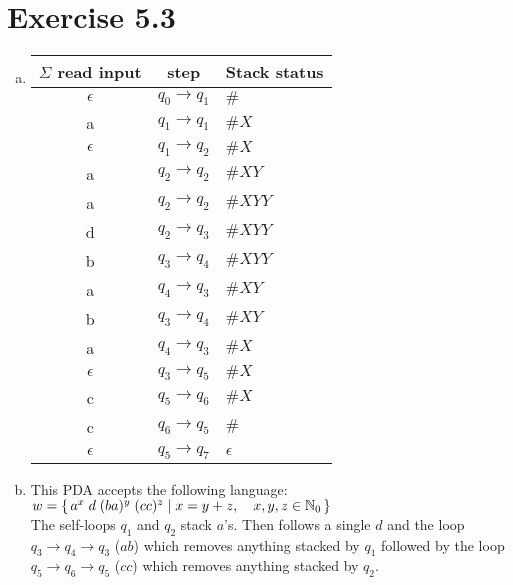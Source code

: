 \documentclass{article} %
\newcommand{\homeworkNumber}{5}
\begin{document}
\section*{Exercise \homeworkNumber.3}
\begin{enumerate}[(a)]
	\item
	\renewcommand{\arraystretch}{1.25}
	\begin{tabular}{ c | c | l }
	$\Sigma$ read input & step & Stack status\\
	\hline
	$\epsilon$ & $q_0 \to q_1$ & $\#$\\
	a & $q_1 \to q_1$ & $\#X$\\
	$\epsilon$ & $q_1 \to q_2$ & $\#X$\\
	a & $q_2 \to q_2$ & $\#XY$\\
	a & $q_2 \to q_2$ & $\#XYY$\\
	d & $q_2 \to q_3$ & $\#XYY$\\
	b & $q_3 \to q_4$ & $\#XYY$\\
	a & $q_4 \to q_3$ & $\#XY$\\
	b & $q_3 \to q_4$ & $\#XY$\\
	a & $q_4 \to q_3$ & $\#X$\\
	$\epsilon$ & $q_3 \to q_5$ & $\#X$\\
	c & $q_5 \to q_6$ & $\#X$\\
	c & $q_6 \to q_5$ & $\#$\\
	$\epsilon$ & $q_5 \to q_7$ & $\epsilon$\\
	\end{tabular}
	
	\item
	This PDA accepts the following language: 
	$w = \set{a^x \; d \; (ba)^y \; (cc)^z \mid x = y+z,\quad x,y,z \in \mathbb{N}_0}$\\
	The self-loops $q_1$ and $q_2$ stack $a$'s. Then follows a single $d$ and the loop $q_3 \to q_4 \to
	q_3$ ($ab$) which removes anything stacked by $q_1$ followed by the loop $q_5 \to q_6 \to q_5$
	($cc$) which removes anything stacked by $q_2$.
\end{enumerate}
\end{document}
